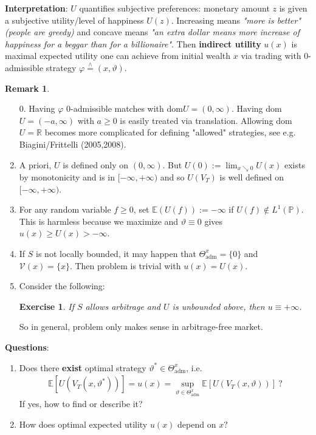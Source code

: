 \documentclass[12pt,a4paper, twoside]{article}
\newtheorem{exe}{Exercise}[section]
\theoremstyle{definition}
\newtheorem{rem}{Remark}[section]
\newcommand{\EE}{\mathbb{E}} %
\newcommand{\PP}{\mathbb{P}} %
\newcommand{\teq}{\overset{\wedge}{=}}
\begin{document}
\noindent \textbf{Interpretation}: $U$ quantifies subjective preferences: monetary amount $z$ is given a subjective utility/level of happiness $U(z)$. Increasing means \textit{"more is better" (people are greedy)} and concave means \textit{"an extra dollar means more increase of happiness for a beggar than for a billionaire"}. Then \textbf{indirect utility} $u(x)$ is maximal expected utility one can achieve from initial wealth $x$ via trading with $0$-admissible strategy $\varphi \teq (x, \vartheta)$. 
\newpage
\begin{rem} \
\begin{enumerate}
\item[0.] Having $\varphi$ $0$-admissible matches with dom$U=(0, \infty)$. Having dom$U=(-a, \infty)$ with $a \geq 0$ is easily treated via translation. Allowing dom$U= \mathbb{R}$ becomes more complicated for defining "allowed" strategies, see e.g. Biagini/Frittelli (2005,2008). 
\item A priori, $U$ is defined only on $(0, \infty)$. But $U(0):= \lim_{x \searrow 0} U(x)$ exists by monotonicity and is in $[- \infty, + \infty)$ and so $U(V_T)$ is well defined on $[- \infty,+ \infty)$. 
\item For any random variable $f \geq 0$, set $\EE(U(f)):= - \infty$ if $U(f) \notin L^1(\PP)$. This is harmless because we maximize and $\vartheta \equiv 0$ gives $u(x) \geq U(x) > - \infty$. 
\item If $S$ is not locally bounded, it may happen that $\Theta_\text{adm}^x = \{0\}$ and $\mathcal{V}(x)= \{ x \}$. Then problem is trivial with $u(x)=U(x)$.  
\item Consider the following:
\begin{exe} \label{ex19} If $S$ allows arbitrage and $U$ is unbounded above, then $u \equiv + \infty$.
\end{exe}
So in general, problem only makes sense in arbitrage-free market. 
\end{enumerate}
\end{rem} 
\noindent \textbf{Questions}: 
\begin{enumerate}[label=(\alph*)]
\item Does there \textbf{exist} optimal strategy $\vartheta^* \in \Theta_\text{adm}^x$, i.e.
\begin{align*}
\EE[ U (V_T(x, \vartheta^*))]= u(x) = \sup_{ \vartheta \in \Theta_\text{adm}^x} \EE[ U(V_T(x, \vartheta))] \ ? 
\end{align*}
If yes, how to find or describe it?
\item How does optimal expected utility $u(x)$ depend on $x?$
\end{enumerate}
\end{document}
